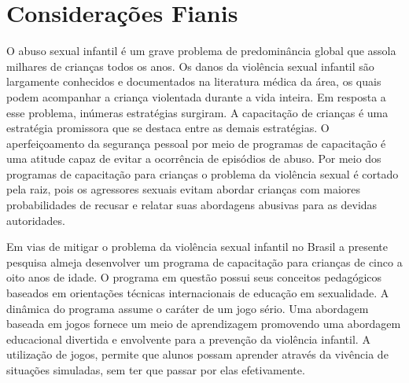 \chapter{Considerações Fianis}\label{ch:Conclusao}


O abuso sexual infantil é um grave problema de predominância global que assola milhares de crianças todos os anos. Os danos da violência sexual infantil são largamente conhecidos e documentados na literatura médica da área, os quais podem acompanhar a criança violentada durante a vida inteira. Em resposta a esse problema, inúmeras estratégias surgiram. A capacitação de crianças é uma estratégia promissora que se destaca entre as demais estratégias. O aperfeiçoamento da segurança pessoal por meio de programas de capacitação é uma atitude capaz de evitar a ocorrência de episódios de abuso. Por meio dos programas de capacitação para crianças o problema da violência sexual é cortado pela raiz, pois os agressores sexuais evitam abordar crianças com maiores probabilidades de recusar e relatar suas abordagens abusivas para as devidas autoridades. 

Em vias de mitigar o problema da violência sexual infantil no Brasil a presente pesquisa almeja desenvolver um programa de capacitação para crianças de cinco a oito anos de idade. O programa em questão possui seus conceitos pedagógicos baseados em orientações técnicas internacionais de educação em sexualidade. A dinâmica do programa assume o caráter de um jogo sério. Uma abordagem baseada em jogos fornece um meio de aprendizagem promovendo uma abordagem educacional divertida e envolvente para a prevenção da violência infantil. A utilização de jogos, permite que alunos possam aprender através da vivência de situações simuladas, sem ter que passar por elas efetivamente.

